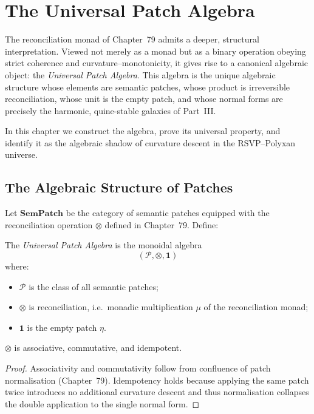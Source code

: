 \chapter{The Universal Patch Algebra}
\label{ch:80}

The reconciliation monad of Chapter~79 admits a deeper, structural
interpretation.  
Viewed not merely as a monad but as a binary operation obeying strict
coherence and curvature–monotonicity, it gives rise to a canonical
algebraic object: the \emph{Universal Patch Algebra}.  
This algebra is the unique algebraic structure whose elements are
semantic patches, whose product is irreversible reconciliation, whose
unit is the empty patch, and whose normal forms are precisely the
harmonic, quine-stable galaxies of Part~III.

In this chapter we construct the algebra, prove its universal property,
and identify it as the algebraic shadow of curvature descent in the
RSVP--Polyxan universe.

\section{The Algebraic Structure of Patches}
\label{sec:80-1}

Let $\mathbf{SemPatch}$ be the category of semantic patches equipped with
the reconciliation operation $\otimes$ defined in Chapter~79.  
Define:

\begin{definition}
The \emph{Universal Patch Algebra} is the monoidal algebra
\[
(\mathcal{P},\otimes,\mathbf{1})
\]
where:
\begin{itemize}
\item $\mathcal{P}$ is the class of all semantic patches;
\item $\otimes$ is reconciliation, i.e.\ monadic multiplication
      $\mu$ of the reconciliation monad;
\item $\mathbf{1}$ is the empty patch $\eta$.
\end{itemize}
\end{definition}

\begin{lemma}
$\otimes$ is associative, commutative, and idempotent.
\end{lemma}

\begin{proof}
Associativity and commutativity follow from confluence of patch
normalisation (Chapter~79).  
Idempotency holds because applying the same patch twice introduces no
additional curvature descent and thus normalisation collapses the
double application to the single normal form.
\end{proof}

